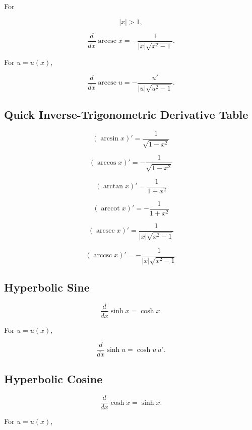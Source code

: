 For

\[
|x|>1,
\]

\[
\boxed{
\frac{d}{dx}\operatorname{arccsc}x
=
-\frac{
1
}{
|x|\sqrt{x^2-1}
}.
}
\]

For \(u=u(x)\),

\[
\boxed{
\frac{d}{dx}\operatorname{arccsc}u
=
-\frac{
u'
}{
|u|\sqrt{u^2-1}
}.
}
\]

\subsection{Quick Inverse-Trigonometric Derivative Table}
\label{subsec:quick-inverse-trig-derivative-table}

\[
\boxed{
(\arcsin x)'
=
\frac{1}{\sqrt{1-x^2}}
}
\]

\[
\boxed{
(\arccos x)'
=
-\frac{1}{\sqrt{1-x^2}}
}
\]

\[
\boxed{
(\arctan x)'
=
\frac{1}{1+x^2}
}
\]

\[
\boxed{
(\operatorname{arccot}x)'
=
-\frac{1}{1+x^2}
}
\]

\[
\boxed{
(\operatorname{arcsec}x)'
=
\frac{
1
}{
|x|\sqrt{x^2-1}
}
}
\]

\[
\boxed{
(\operatorname{arccsc}x)'
=
-\frac{
1
}{
|x|\sqrt{x^2-1}
}
}
\]

\subsection{Hyperbolic Sine}
\label{subsec:sinh-derivative-reference}

\[
\boxed{
\frac{d}{dx}\sinh x
=
\cosh x.
}
\]

For \(u=u(x)\),

\[
\boxed{
\frac{d}{dx}\sinh u
=
\cosh u\,u'.
}
\]

\subsection{Hyperbolic Cosine}
\label{subsec:cosh-derivative-reference}

\[
\boxed{
\frac{d}{dx}\cosh x
=
\sinh x.
}
\]

For \(u=u(x)\),

